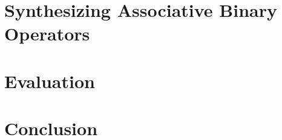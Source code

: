 \documentclass{main}
\begin{document}
\section{Synthesizing Associative Binary Operators}
\label{synthesize}


\section{Evaluation}
\label{evaluation}


\section{Conclusion}
\label{conclusion}



%
%
\end{document}
